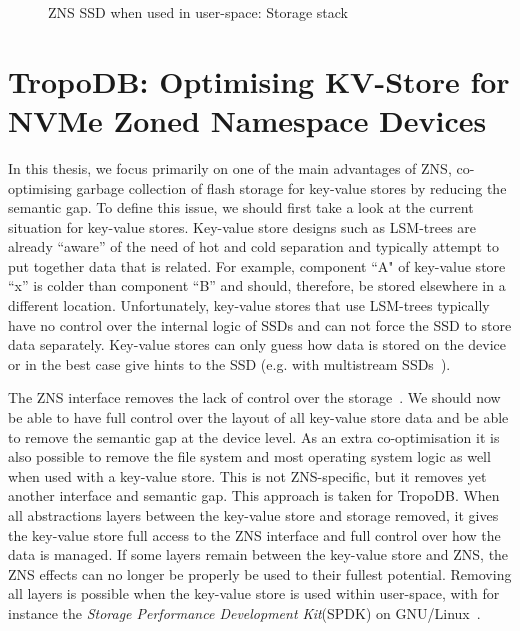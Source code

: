 \begin{figure}[t!]
\centering
\begin{minipage}{0.45\textwidth}
  \centering
  
\end{minipage}%
\caption{ ZNS SSD when used in user-space: Storage stack }
\label{fig:znsuserstoragestack}
\end{figure}

\section{TropoDB: Optimising KV-Store for NVMe Zoned \mbox{Namespace} Devices}
In this thesis, we focus primarily on one of the main advantages of ZNS, co-optimising garbage collection of flash storage for key-value stores by reducing the semantic gap. To define this issue, we should first take a look at the current situation for key-value stores. Key-value store designs such as LSM-trees are already ``aware'' of the need of hot and cold separation and typically attempt to put together data that is related. For example, component ``A" of key-value store ``x'' is colder than component ``B'' and should, therefore, be stored elsewhere in a different location. Unfortunately, key-value stores that use LSM-trees typically have no control over the internal logic of SSDs and can not force the SSD to store data separately. Key-value stores can only guess how data is stored on the device or in the best case give hints to the SSD (e.g. with multistream SSDs~\cite{lakshman2010cassandra, dong2021evolution, yang2015optimizing}).

The ZNS interface removes the lack of control over the storage~\cite{purandareappend}. We should now be able to have full control over the layout of all key-value store data and be able to remove the semantic gap at the device level. As an extra co-optimisation it is also possible to remove the file system and most operating system logic as well when used with a key-value store. This is not ZNS-specific, but it removes yet another interface and semantic gap. This approach is taken for TropoDB. When all abstractions layers between the key-value store and storage removed, it gives the key-value store full access to the ZNS interface and full control over how the data is managed. If some layers remain between the key-value store and ZNS, the ZNS effects can no longer be properly be used to their fullest potential. Removing all layers is possible when the key-value store is used within user-space, with for instance the \textit{Storage Performance Development Kit}(SPDK) on GNU/Linux~\cite{spdk}.


